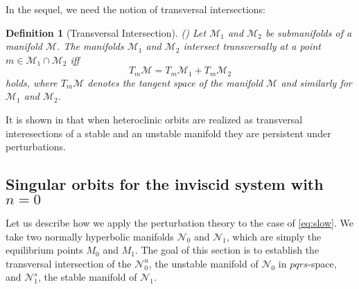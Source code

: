 \documentclass[11pt]{article}
\newtheorem{definition}{Definition}[section]
\theoremstyle{remark}
\begin{document}
In the sequel, we need the notion of transversal intersections:

\begin{definition}[Transversal Intersection]  (\cite[Definition 3.1]{Sz1991})
 Let ${\mathcal{M}}_1$ and ${\mathcal{M}}_2$ be submanifolds of a manifold ${\mathcal{M}}$. The manifolds ${\mathcal{M}}_1$ and ${\mathcal{M}}_2$ intersect transversally at a point $m\in{\mathcal{M}}_1\cap {\mathcal{M}}_2$ iff
 $$T_m{\mathcal{M}} =  T_m{\mathcal{M}}_1+T_m{\mathcal{M}}_2$$
 holds, where $T_m\mathcal{M}$ denotes the tangent space of the manifold $\mathcal{M}$ and similarly for $\mathcal{M}_1$ and $\mathcal{M}_2$.
\end{definition}

It is shown in \cite{Sz1991} that when heteroclinic orbits are realized as transversal interesections of a stable and an unstable manifold
they are persistent under perturbations.




\subsection{Singular orbits for the inviscid system with $n=0$}\label{sec:singorb}

Let us describe how we apply the perturbation theory to the case of \eqref{eq:slow}. We take two normally hyperbolic manifolds %
$\mathcal{N}_0$ and $\mathcal{N}_1$, which are simply the equilibrium points $M_0$ and $M_1$. The goal of this section is to establish the transversal intersection of the $\mathcal{N}_0^u$, the unstable manifold of $\mathcal{N}_0$  in $pqrs$-space, and $\mathcal{N}^s_1$, the stable manifold of $\mathcal{N}_1$.
\end{document}
